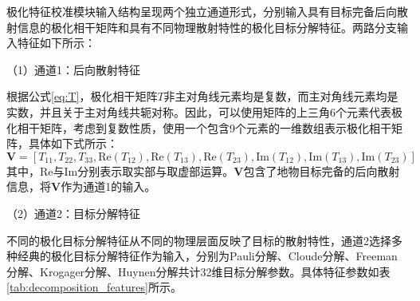 极化特征校准模块输入结构呈现两个独立通道形式，分别输入具有目标完备后向散射信息的极化相干矩阵和具有不同物理散射特性的极化目标分解特征。两路分支输入特征如下所示：

（1）通道1：后向散射特征

根据公式\eqref{eq:T}，极化相干矩阵$T$非主对角线元素均是复数，而主对角线元素均是实数，并且关于主对角线共轭对称。因此，可以使用矩阵的上三角6个元素代表极化相干矩阵，考虑到复数性质，使用一个包含9个元素的一维数组表示极化相干矩阵，具体如下式所示：
\begin{equation}
    \mathbf{V}=[T_{11}, T_{22}, T_{33}, \text{Re}(T_{12}), \text{Re}(T_{13}), \text{Re}(T_{23}), \text{Im}(T_{12}), \text{Im}(T_{13}), \text{Im}(T_{23})]
\end{equation}
其中，$\text{Re}$与$\text{Im}$分别表示取实部与取虚部运算。$\mathbf{V}$包含了地物目标完备的后向散射信息，将$\mathbf{V}$作为通道1的输入。

（2）通道2：目标分解特征

不同的极化目标分解特征从不同的物理层面反映了目标的散射特性，通道2选择多种经典的极化目标分解特征作为输入，分别为Pauli分解、Cloude分解、Freeman分解、Krogager分解、Huynen分解共计32维目标分解参数。具体特征参数如表\ref{tab:decomposition_features}所示。

